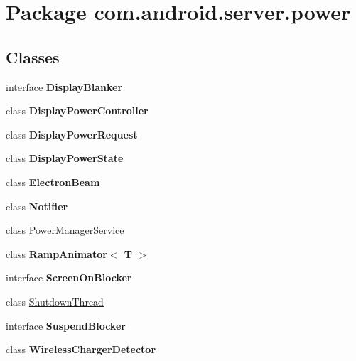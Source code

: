 \hypertarget{namespacecom_1_1android_1_1server_1_1power}{\section{Package com.\-android.\-server.\-power}
\label{namespacecom_1_1android_1_1server_1_1power}
}
\subsection*{Classes}
\begin{DoxyCompactItemize}
\item 
interface {\bfseries Display\-Blanker}
\item 
class {\bfseries Display\-Power\-Controller}
\item 
class {\bfseries Display\-Power\-Request}
\item 
class {\bfseries Display\-Power\-State}
\item 
class {\bfseries Electron\-Beam}
\item 
class {\bfseries Notifier}
\item 
class \hyperlink{classcom_1_1android_1_1server_1_1power_1_1PowerManagerService}{Power\-Manager\-Service}
\item 
class {\bfseries Ramp\-Animator$<$ T $>$}
\item 
interface {\bfseries Screen\-On\-Blocker}
\item 
class \hyperlink{classcom_1_1android_1_1server_1_1power_1_1ShutdownThread}{Shutdown\-Thread}
\item 
interface {\bfseries Suspend\-Blocker}
\item 
class {\bfseries Wireless\-Charger\-Detector}
\end{DoxyCompactItemize}
